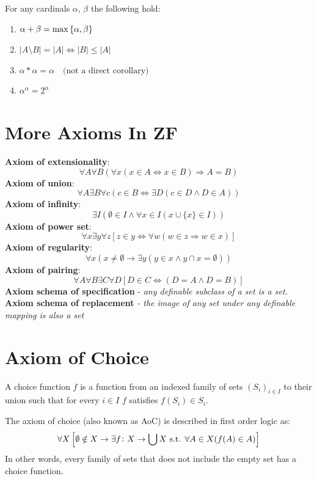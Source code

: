 \documentclass[11pt,a4paper]{article}
\begin{document}
For any cardinals $\alpha$, $\beta$ the following hold:
\begin{enumerate}
  \item $\alpha + \beta = \max\left\{\alpha,\beta\right\}$
  \item $|A \setminus B| = |A| \iff |B| \le |A|$
  \item $\alpha * \alpha = \alpha \quad\text{(not a direct corollary)}$
  \item $\alpha^\alpha = 2^\alpha$
\end{enumerate}

\newpage
\section{More Axioms In ZF}
\textbf{Axiom of extensionality}:
\[
	\forall A\forall B(\forall x(x\in A \iff x\in B)\Rightarrow A=B)
\]
\textbf{Axiom of union}:
\[
	\forall A \exists B \forall c(c\in B \iff \exists D(c\in D \land D\in A))
\]
\textbf{Axiom of infinity}:
\[
	\exists I(\emptyset \in I \land \forall x\in I (x\cup \{x\}\in I))
\]
\textbf{Axiom of power set}:
\[
	\forall x \exists y \forall z
	[z\in y \iff \forall w(w\in z \Rightarrow w\in x)]
\]
\textbf{Axiom of regularity}:
\[
	\forall 
	x(x\neq\emptyset \rightarrow \exists y(y\in x \land y\cap x = \emptyset))
\]
\textbf{Axiom of pairing}:
\[
	\forall A\forall B \exists C\forall D[D\in C \iff (D=A \land D=B)]
\]
\textbf{Axiom schema of specification} - \emph{any definable subclass of a set is a set.} \\
\textbf{Axiom schema of replacement} \emph{- the image of any set under any definable mapping is also a set}

\section{Axiom of Choice}
\begin{definition}
A choice function $f$ is a function from an indexed family of sets 
$(S_i)_{i\in I}$ to their union such that for every $i\in I$
$f$ satisfies $f(S_i) \in S_i$.
\end{definition}

\begin{definition}
The axiom of choice (also known as AoC) is described in first order logic as:
\[
	\forall X \left[\emptyset \notin X \rightarrow \exists 
    f \colon X \to \bigcup X \text{ s.t. } \forall A\in X(f(A)\in A)\right]
\]
In other words, every family of sets that does not include the empty set
has a choice function.
\end{definition}
\end{document}
